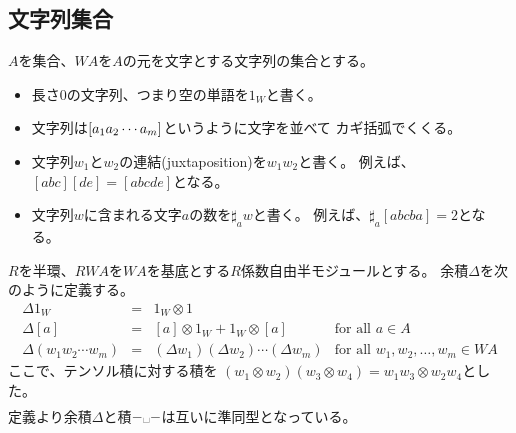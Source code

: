 \subsection{文字列集合}\label{s2:文字列集合} %
	$A$を集合、$WA$を$A$の元を文字とする文字列の集合とする。
	\begin{itemize}\setlength{\itemsep}{-1mm} %
		\item 長さ$0$の文字列、つまり空の単語を$1_W$と書く。
		\item 文字列は$\left[{a_1a_2\cdots a_m}\right]$というように文字を並べて
		カギ括弧でくくる。
		\item 文字列$w_1$と$w_2$の連結(juxtaposition)を$w_1w_2$と書く。
		例えば、$[abc][de]=[abcde]$となる。
		\item 文字列$w$に含まれる文字$a$の数を$\sharp_aw$と書く。
		例えば、$\sharp_a[abcba]=2$となる。
	\end{itemize} %
	$R$を半環、$RWA$を$WA$を基底とする$R$係数自由半モジュールとする。
	余積$\Delta$を次のように定義する。
	\begin{equation*}\begin{array}{rcll} %
		\Delta1_W &=& 1_W\otimes1 \\
		\Delta[a] &=& [a]\otimes1_W+1_W\otimes[a] & \text{for all }a\in A \\
		\Delta(w_1w_2\cdots w_m) &=& (\Delta w_1)(\Delta w_2)\cdots(\Delta w_m)
			& \text{for all }w_1,w_2,\dots,w_m\in WA
	\end{array}\end{equation*} %
	ここで、テンソル積に対する積を
	$(w_1\otimes w_2)(w_3\otimes w_4)=w_1w_3\otimes w_2w_4$とした。
	\begin{equation*}\begin{split} %
	\end{split}\end{equation*} %
	定義より余積$\Delta$と積$-\myspace-$は互いに準同型となっている。

